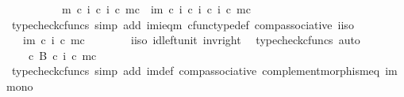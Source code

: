 \begin{isabellebody}
\ \ \isamarkupfalse%
\ {\isacharminus}{\kern0pt}\isanewline
\ \ \ \ \isamarkupfalse%
\ {\isachardoublequoteopen}{\isasymchi}m\ {\isasymcirc}\isactrlsub c\ {\isacharparenleft}{\kern0pt}i\isactrlbold {\isasyminverse}\ {\isasymcirc}\isactrlsub c\ {\isacharparenleft}{\kern0pt}i\ {\isasymcirc}\isactrlsub c\ m{\isacharparenright}{\kern0pt}\isactrlsup c{\isacharparenright}{\kern0pt}\ {\isacharequal}{\kern0pt}\ {\isasymchi}im\ {\isasymcirc}\isactrlsub c\ {\isacharparenleft}{\kern0pt}i\ {\isasymcirc}\isactrlsub c\ i\isactrlbold {\isasyminverse}{\isacharparenright}{\kern0pt}\ {\isasymcirc}\isactrlsub c\ {\isacharparenleft}{\kern0pt}i\ {\isasymcirc}\isactrlsub c\ m{\isacharparenright}{\kern0pt}\isactrlsup c{\isachardoublequoteclose}\isanewline
\ \ \ \ \ \ \isamarkupfalse%
\ {\isacharparenleft}{\kern0pt}typecheck{\isacharunderscore}{\kern0pt}cfuncs{\isacharcomma}{\kern0pt}\ simp\ add{\isacharcolon}{\kern0pt}\ {\isasymchi}im{\isacharunderscore}{\kern0pt}i{\isacharunderscore}{\kern0pt}eq{\isacharunderscore}{\kern0pt}{\isasymchi}m\ cfunc{\isacharunderscore}{\kern0pt}type{\isacharunderscore}{\kern0pt}def\ comp{\isacharunderscore}{\kern0pt}associative\ i{\isacharunderscore}{\kern0pt}iso{\isacharparenright}{\kern0pt}\isanewline
\ \ \ \ \isamarkupfalse%
\ \isamarkupfalse%
\ {\isachardoublequoteopen}{\isachardot}{\kern0pt}{\isachardot}{\kern0pt}{\isachardot}{\kern0pt}\ {\isacharequal}{\kern0pt}\ {\isasymchi}im\ {\isasymcirc}\isactrlsub c\ {\isacharparenleft}{\kern0pt}i\ {\isasymcirc}\isactrlsub c\ m{\isacharparenright}{\kern0pt}\isactrlsup c{\isachardoublequoteclose}\isanewline
\ \ \ \ \ \ \isamarkupfalse%
\ i{\isacharunderscore}{\kern0pt}iso\ id{\isacharunderscore}{\kern0pt}left{\isacharunderscore}{\kern0pt}unit{}\ inv{\isacharunderscore}{\kern0pt}right\ \isamarkupfalse%
\ {\isacharparenleft}{\kern0pt}typecheck{\isacharunderscore}{\kern0pt}cfuncs{\isacharcomma}{\kern0pt}\ auto{\isacharparenright}{\kern0pt}\isanewline
\ \ \ \ \isamarkupfalse%
\ \isamarkupfalse%
\ {\isachardoublequoteopen}{\isachardot}{\kern0pt}{\isachardot}{\kern0pt}{\isachardot}{\kern0pt}\ {\isacharequal}{\kern0pt}\ {\isasymf}\ {\isasymcirc}\isactrlsub c\ {\isasymbeta}\isactrlbsub B\isactrlesub \ {\isasymcirc}\isactrlsub c\ {\isacharparenleft}{\kern0pt}i\ {\isasymcirc}\isactrlsub c\ m{\isacharparenright}{\kern0pt}\isactrlsup c{\isachardoublequoteclose}\isanewline
\ \ \ \ \ \ \isamarkupfalse%
\ {\isacharparenleft}{\kern0pt}typecheck{\isacharunderscore}{\kern0pt}cfuncs{\isacharcomma}{\kern0pt}\ simp\ add{\isacharcolon}{\kern0pt}\ {\isasymchi}im{\isacharunderscore}{\kern0pt}def\ comp{\isacharunderscore}{\kern0pt}associative{}\ complement{\isacharunderscore}{\kern0pt}morphism{\isacharunderscore}{\kern0pt}eq\ im{\isacharunderscore}{\kern0pt}mono{\isacharparenright}{\kern0pt}\isanewline

\end{isabellebody}
